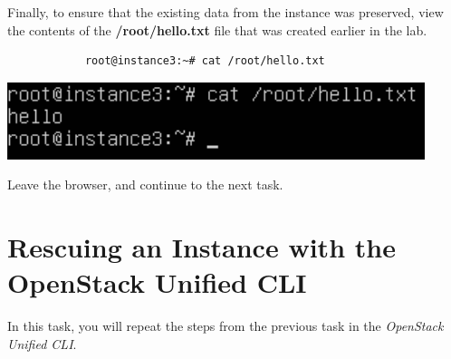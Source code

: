 \documentclass[letterpaper, 12pt]{article}
\begin{document}
\begin{enumerate}
    \begin{labstep}
        Finally, to ensure that the existing data from the instance was preserved, view the contents of the \textbf{/root/hello.txt} file that was created earlier in the lab.
        \begin{lstlisting}
            root@instance3:~# cat /root/hello.txt
        \end{lstlisting}

        \begin{center}
            \includegraphics[width=\linewidth]{images/part7/step25.png}
        \end{center}
    \end{labstep}

    \begin{labstep}
        Leave the browser, and continue to the next task.
    \end{labstep}

\end{enumerate}

\section{Rescuing an Instance with the OpenStack Unified CLI}\label{sec:rescuing_an_instance_with_the_openstack_unified_cli}
In this task, you will repeat the steps from the previous task in the \textit{OpenStack Unified CLI}.
\end{document}
